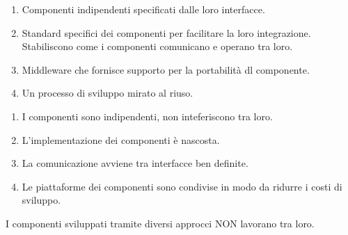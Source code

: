 {    \vspace{8pt}

    \begin{enumerate}
        \item Componenti indipendenti specificati dalle loro interfacce.
        \item Standard specifici dei componenti per facilitare la loro integrazione.\\
              Stabiliscono come i componenti comunicano e operano tra loro.
        \item Middleware che fornisce supporto per la portabilità dl componente.
        \item Un processo di sviluppo mirato al riuso.
    \end{enumerate}

    \begin{enumerate}
        \item I componenti sono indipendenti, non inteferiscono tra loro.
        \item L'implementazione dei componenti è nascosta.
        \item La comunicazione avviene tra interfacce ben definite.
        \item Le piattaforme dei componenti sono condivise in modo da ridurre i costi di sviluppo.
    \end{enumerate}

    I componenti sviluppati tramite diversi approcci NON lavorano tra loro.

}
